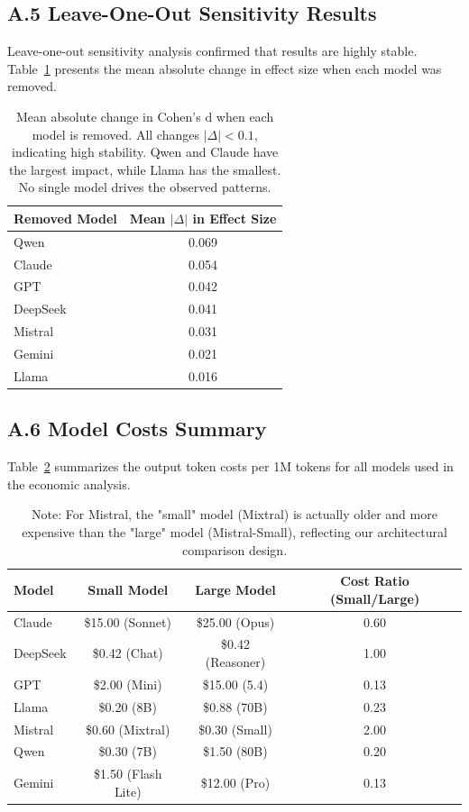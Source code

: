 \documentclass{article}
\begin{document}
\newpage
\subsection*{A.5 Leave-One-Out Sensitivity Results}

Leave-one-out sensitivity analysis confirmed that results are highly stable. Table~\ref{tab:loo_novelty} presents the mean absolute change in effect size when each model was removed.

\begin{table}[H]
\centering
\caption{Leave-One-Out Sensitivity Analysis for Novelty}
\label{tab:loo_novelty}
\begin{tabular}{lc}
\toprule
Removed Model & Mean $|\Delta|$ in Effect Size \\
\midrule
Qwen & 0.069 \\
Claude & 0.054 \\
GPT & 0.042 \\
DeepSeek & 0.041 \\
Mistral & 0.031 \\
Gemini & 0.021 \\
Llama & 0.016 \\
\bottomrule
\end{tabular}
\caption*{\footnotesize Mean absolute change in Cohen's d when each model is removed. All changes $|\Delta| < 0.1$, indicating high stability. Qwen and Claude have the largest impact, while Llama has the smallest. No single model drives the observed patterns.}
\end{table}

\newpage
\subsection*{A.6 Model Costs Summary}

Table~\ref{tab:costs_full} summarizes the output token costs per 1M tokens for all models used in the economic analysis.

\begin{table}[H]
\centering
\caption{Model Costs Summary (Output Token Cost per 1M Tokens)}
\label{tab:costs_full}
\begin{tabular}{lccc}
\toprule
Model & Small Model & Large Model & Cost Ratio (Small/Large) \\
\midrule
Claude & \$15.00 (Sonnet) & \$25.00 (Opus) & 0.60 \\
DeepSeek & \$0.42 (Chat) & \$0.42 (Reasoner) & 1.00 \\
GPT & \$2.00 (Mini) & \$15.00 (5.4) & 0.13 \\
Llama & \$0.20 (8B) & \$0.88 (70B) & 0.23 \\
Mistral & \$0.60 (Mixtral) & \$0.30 (Small) & 2.00 \\
Qwen & \$0.30 (7B) & \$1.50 (80B) & 0.20 \\
Gemini & \$1.50 (Flash Lite) & \$12.00 (Pro) & 0.13 \\
\bottomrule
\end{tabular}
\caption*{\footnotesize Note: For Mistral, the "small" model (Mixtral) is actually older and more expensive than the "large" model (Mistral-Small), reflecting our architectural comparison design.}
\end{table}
\end{document}
